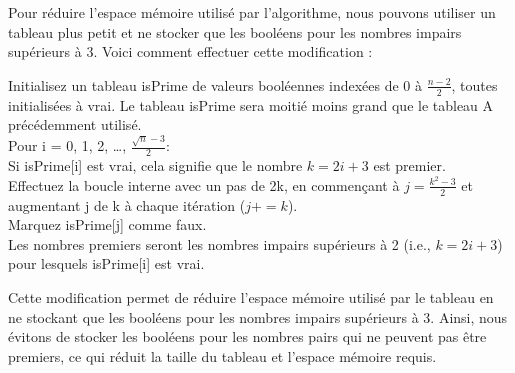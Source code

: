 \documentclass[
]{article}
\begin{document}
Pour réduire l'espace mémoire utilisé par l'algorithme, nous pouvons
utiliser un tableau plus petit et ne stocker que les booléens pour les
nombres impairs supérieurs à 3. Voici comment effectuer cette
modification :

Initialisez un tableau isPrime de valeurs booléennes indexées de 0 à
\(\frac{n - 2}{2}\), toutes initialisées à vrai. Le tableau isPrime sera
moitié moins grand que le tableau A précédemment utilisé.\\
Pour i = 0, 1, 2, \ldots, \(\frac{\sqrt{n} - 3}{2}\):\\
Si isPrime{[}i{]} est vrai, cela signifie que le nombre \(k = 2i + 3\)
est premier.\\
Effectuez la boucle interne avec un pas de 2k, en commençant à
\(j = \frac{k^2 - 3}{2}\) et augmentant j de k à chaque itération
(\(j += k\)).\\
Marquez isPrime{[}j{]} comme faux.\\
Les nombres premiers seront les nombres impairs supérieurs à 2 (i.e.,
\(k = 2i + 3\)) pour lesquels isPrime{[}i{]} est vrai.

Cette modification permet de réduire l'espace mémoire utilisé par le
tableau en ne stockant que les booléens pour les nombres impairs
supérieurs à 3. Ainsi, nous évitons de stocker les booléens pour les
nombres pairs qui ne peuvent pas être premiers, ce qui réduit la taille
du tableau et l'espace mémoire requis.
\end{document}
